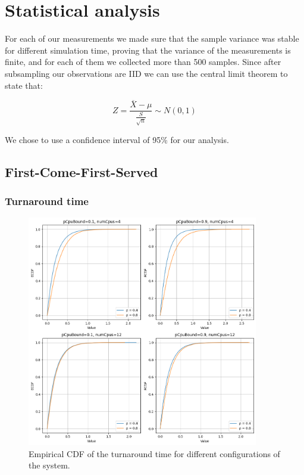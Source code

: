 \section{Statistical analysis}

For each of our measurements we made sure that the sample variance was stable for different simulation time, proving that the variance of the measurements is finite, and for each of them we collected more than 500 samples. Since after subsampling our observations are IID we can use the central limit theorem to state that:


\begin{equation}
    Z = \frac{\overline{X} - \mu}{\frac{S}{\sqrt{n}}} \sim N(0,1)
\end{equation}

We chose to use a confidence interval of 95\% for our analysis.

\subsection{First-Come-First-Served}
\subsubsection{Turnaround time}

\begin{figure}
    \captionsetup{type=figure}
    \centering
    \includegraphics[width=0.9\textwidth]{./images/04/fcfs/ecdf.png}
    \caption{Empirical CDF of the turnaround time for different configurations of the system.}
    \label{fig:fcfs_ecdf}
\end{figure}


